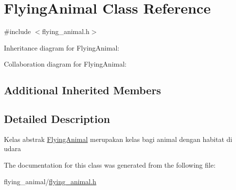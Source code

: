 \hypertarget{classFlyingAnimal}{}\section{Flying\+Animal Class Reference}
\label{classFlyingAnimal}


{\ttfamily \#include $<$flying\+\_\+animal.\+h$>$}



Inheritance diagram for Flying\+Animal\+:


Collaboration diagram for Flying\+Animal\+:
\subsection*{Additional Inherited Members}


\subsection{Detailed Description}
Kelas abstrak \hyperlink{classFlyingAnimal}{Flying\+Animal} merupakan kelas bagi animal dengan habitat di udara 

The documentation for this class was generated from the following file\+:\begin{DoxyCompactItemize}
\item 
flying\+\_\+animal/\hyperlink{flying__animal_8h}{flying\+\_\+animal.\+h}\end{DoxyCompactItemize}
